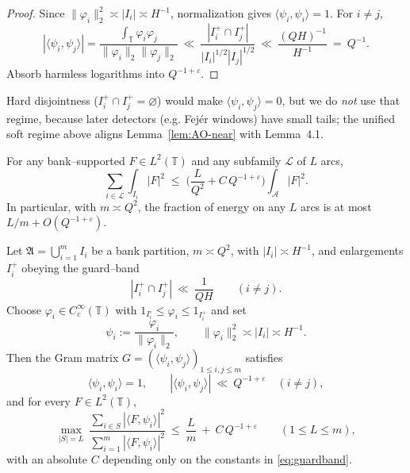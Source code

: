 \begin{proof}
Since $\|\varphi_i\|_2^2\asymp |I_i|\asymp H^{-1}$, normalization gives $\langle\psi_i,\psi_i\rangle=1$.
For $i\ne j$,
\[
|\langle \psi_i,\psi_j\rangle|
=\frac{\int_{\mathbb T}\varphi_i\varphi_j}{\|\varphi_i\|_2\|\varphi_j\|_2}
\ \ll\ \frac{|I_i^+\cap I_j^+|}{|I_i|^{1/2}|I_j|^{1/2}}
\ \ll\ \frac{(QH)^{-1}}{H^{-1}}\ =\ Q^{-1}.
\]
Absorb harmless logarithms into $Q^{-1+\varepsilon}$.
\end{proof}

\begin{remark}
Hard disjointness ($I_i^+\cap I_j^+=\varnothing$) would make $\langle\psi_i,\psi_j\rangle=0$, but we do \emph{not} use that regime, because later detectors (e.g. Fejér windows) have small tails; the unified soft regime above aligns Lemma~\ref{lem:AO-near} with Lemma~4.1.
\end{remark}

\begin{corollary}\label{cor:AO-nohot}
For any bank–supported $F\in L^2(\mathbb T)$ and any subfamily $\mathcal L$ of $L$ arcs,
\[
\sum_{i\in\mathcal L}\int_{I_i}|F|^2
\;\le\;
\Big(\frac{L}{Q^2}+C\,Q^{-1+\varepsilon}\Big)\int_{\mathcal A}|F|^2.
\]
In particular, with $m\asymp Q^2$, the fraction of energy on any $L$ arcs is at most $L/m+O(Q^{-1+\varepsilon})$.
\end{corollary}

\begin{theorem}\label{thm:AO-dispersion-full}
Let $\mathfrak A=\bigcup_{i=1}^{m} I_i$ be a bank partition, $m\asymp Q^2$, with $|I_i|\asymp H^{-1}$, and enlargements $I_i^+$ obeying the guard--band
\begin{equation}\label{eq:guardband}
|I_i^+\cap I_j^+|\ \ll\ \frac{1}{QH}\qquad(i\neq j).
\end{equation}
Choose $\varphi_i\in C_c^\infty(\mathbb T)$ with $1_{I_i^\circ}\le \varphi_i\le 1_{I_i^+}$ and set
\[
\psi_i:=\frac{\varphi_i}{\|\varphi_i\|_2},\qquad \|\varphi_i\|_2^2\asymp |I_i| \asymp H^{-1}.
\]
Then the Gram matrix $G=(\langle\psi_i,\psi_j\rangle)_{1\le i,j\le m}$ satisfies
\begin{equation}\label{eq:near-orth}
\langle\psi_i,\psi_i\rangle = 1,\qquad 
|\langle\psi_i,\psi_j\rangle|\ \ll\ Q^{-1+\varepsilon}\quad (i\ne j),
\end{equation}
and for every $F\in L^2(\mathbb T)$,
\begin{equation}\label{eq:AO-ratio}
\max_{|S|=L}\ \frac{\sum_{i\in S}|\langle F,\psi_i\rangle|^2}{\sum_{i=1}^{m}|\langle F,\psi_i\rangle|^2}
\ \le\ \frac{L}{m}\ +\ C\,Q^{-1+\varepsilon}\qquad(1\le L\le m),
\end{equation}
with an absolute $C$ depending only on the constants in \eqref{eq:guardband}.
\end{theorem}

